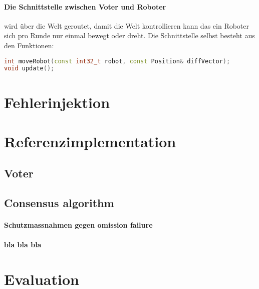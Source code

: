 \documentclass[
    12pt,
    bibliography=totoc,
    ngerman
]{scrartcl}
\begin{document}
\paragraph{Die Schnittstelle zwischen Voter und Roboter} wird {\"{u}}ber die Welt geroutet, damit die Welt kontrollieren kann das ein
Roboter sich pro Runde nur einmal bewegt oder dreht. Die Schnittstelle selbst besteht aus den Funktionen:
\begin{lstlisting}[frame=single, language=c++] 
int moveRobot(const int32_t robot, const Position& diffVector);
void update();
\end{lstlisting}


\clearpage
\section{Fehlerinjektion}

\clearpage
\section{Referenzimplementation}
\subsection{Voter}\label{voter}
\subsection{Consensus algorithm}
\paragraph{Schutzmassnahmen gegen omission failure}
\paragraph{bla bla bla}


\clearpage
\section{Evaluation}


\clearpage

%

\end{document}

